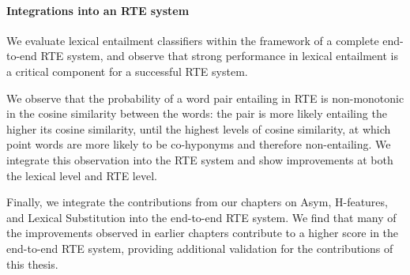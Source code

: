 \paragraph{Integrations into an RTE system}
We evaluate lexical entailment classifiers within the framework of
    a complete end-to-end RTE system, and observe that strong performance
    in lexical entailment is a critical component for a successful RTE system.

We observe that the probability of a word pair entailing in RTE is
    non-monotonic in the cosine similarity between the words: the pair is
    more likely entailing the higher its cosine similarity, until the
    highest levels of cosine similarity, at which point words are more likely
    to be co-hyponyms and therefore non-entailing. We integrate this observation
    into the RTE system and show improvements at both the lexical level and
    RTE level.

Finally, we integrate the contributions from our chapters on
    Asym, H-features, and Lexical Substitution into the end-to-end RTE system.
    We find that many of the improvements observed in earlier chapters contribute
    to a higher score in the end-to-end RTE system, providing additional
    validation for the contributions of this thesis.


